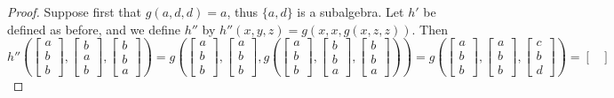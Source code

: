 \documentclass[10pt,a4paper]{amsart}
\begin{document}
\begin{proof}
Suppose first that $g(a,d,d)=a$, thus $\{a,d\}$ is a subalgebra. Let $h'$ be defined as before, and we define $h''$ by $h''(x,y,z)=g(x,x,g(x,z,z))$. Then 
\begin{equation*}
h''\left(
\begin{bmatrix}
a \\
b \\
b
\end{bmatrix}\!,\!
\begin{bmatrix}
b \\
a \\
b
\end{bmatrix}\!,\!
\begin{bmatrix}
b \\
b \\
a
\end{bmatrix}
\right)=
g\left(
\begin{bmatrix}
a \\
b \\
b
\end{bmatrix}\!,\!
\begin{bmatrix}
a \\
b \\
b
\end{bmatrix}\!,\!
g\left(
\begin{bmatrix}
a \\
b \\
b
\end{bmatrix}\!,\!
\begin{bmatrix}
b \\
b \\
a
\end{bmatrix}\!,\!
\begin{bmatrix}
b \\
b \\
a
\end{bmatrix}
\right)
\right)=
g\left(
\begin{bmatrix}
a \\
b \\
b
\end{bmatrix}\!,\!
\begin{bmatrix}
a \\
b \\
b
\end{bmatrix}\!,\!
\begin{bmatrix}
c \\
b \\
d
\end{bmatrix}
\right)=
\begin{bmatrix}

\end{bmatrix}
\end{equation*}
\end{proof}
\end{document}
